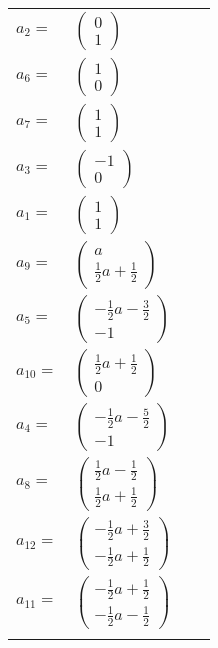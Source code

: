 \documentclass[1p]{elsarticle_modified}
\theoremstyle{definition}
\begin{document}
\begin{tabular}{m{7pt} m{180pt} m{7pt} m{180pt} }
\flushright $a_{2}=$&$\begin{pmatrix}0\\1\end{pmatrix}$ \\
\flushright $a_{6}=$&$\begin{pmatrix}1\\0\end{pmatrix}$ \\
\flushright $a_{7}=$&$\begin{pmatrix}1\\1\end{pmatrix}$ \\
\flushright $a_{3}=$&$\begin{pmatrix}-1\\0\end{pmatrix}$ \\
\flushright $a_{1}=$&$\begin{pmatrix}1\\1\end{pmatrix}$ \\
\flushright $a_{9}=$&$\begin{pmatrix}a\\\frac{1}{2} a+\frac{1}{2}\end{pmatrix}$ \\
\flushright $a_{5}=$&$\begin{pmatrix}-\frac{1}{2} a-\frac{3}{2}\\-1\end{pmatrix}$ \\
\flushright $a_{10}=$&$\begin{pmatrix}\frac{1}{2} a+\frac{1}{2}\\0\end{pmatrix}$ \\
\flushright $a_{4}=$&$\begin{pmatrix}-\frac{1}{2} a-\frac{5}{2}\\-1\end{pmatrix}$ \\
\flushright $a_{8}=$&$\begin{pmatrix}\frac{1}{2} a-\frac{1}{2}\\\frac{1}{2} a+\frac{1}{2}\end{pmatrix}$ \\
\flushright $a_{12}=$&$\begin{pmatrix}-\frac{1}{2} a+\frac{3}{2}\\-\frac{1}{2} a+\frac{1}{2}\end{pmatrix}$ \\
\flushright $a_{11}=$&$\begin{pmatrix}-\frac{1}{2} a+\frac{1}{2}\\-\frac{1}{2} a-\frac{1}{2}\end{pmatrix}$\\&\end{tabular}
\end{document}

